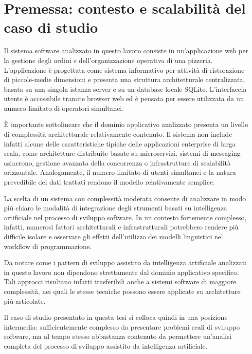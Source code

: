 \section{Premessa: contesto e scalabilità del caso di studio}

Il sistema software analizzato in questo lavoro consiste in un'applicazione web per la gestione degli ordini e dell'organizzazione operativa di una pizzeria. L'applicazione è progettata come sistema informativo per attività di ristorazione di piccole-medie dimensioni e presenta una struttura architetturale centralizzata, basata su una singola istanza server e su un database locale SQLite. L'interfaccia utente è accessibile tramite browser web ed è pensata per essere utilizzata da un numero limitato di operatori simultanei.

È importante sottolineare che il dominio applicativo analizzato presenta un livello di complessità architetturale relativamente contenuto. Il sistema non include infatti alcune delle caratteristiche tipiche delle applicazioni enterprise di larga scala, come architetture distribuite basate su microservizi, sistemi di messaging asincrono, gestione avanzata della concorrenza o infrastrutture di scalabilità orizzontale. Analogamente, il numero limitato di utenti simultanei e la natura prevedibile dei dati trattati rendono il modello relativamente semplice.

La scelta di un sistema con complessità moderata consente di analizzare in modo più chiaro le modalità di integrazione degli strumenti basati su intelligenza artificiale nel processo di sviluppo software. In un contesto fortemente complesso, infatti, numerosi fattori architetturali e infrastrutturali potrebbero rendere più difficile isolare e osservare gli effetti dell'utilizzo dei modelli linguistici nel workflow di programmazione.

Da notare come i pattern di sviluppo assistito da intelligenza artificiale analizzati in questo lavoro non dipendono strettamente dal dominio applicativo specifico. Tali approcci risultano infatti trasferibili anche a sistemi software di maggiore complessità, nei quali le stesse tecniche possono essere applicate su architetture più articolate.

Il caso di studio presentato in questa tesi si colloca quindi in una posizione intermedia: sufficientemente complesso da presentare problemi reali di sviluppo software, ma al tempo stesso abbastanza contenuto da permettere un'analisi completa del processo di sviluppo assistito da intelligenza artificiale.

